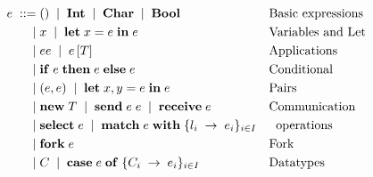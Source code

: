 \begin{figure}
  \begin{align*}
    e \; ::= \; & () \;\mid\; \mathbf{Int} \;\mid\; \mathbf{Char} \;\mid\; \mathbf{Bool} && \text{Basic expressions}\\
    \;\mid\; & x \;\mid\; \mathbf{let} \; x = e \; \mathbf{in} \; e && \text{Variables and Let}\\
    \;\mid\; & ee \;\mid\; e\,[T] && \text{Applications}\\
    \;\mid\; & \mathbf{if}\;e\;\mathbf{then}\;e\;\mathbf{else} \; e && \text{Conditional}\\
    \;\mid\; & (e,e) \;\mid\; \mathbf{let}\;x, y = e\;\mathbf{in}\;e && \text{Pairs}\\
    \;\mid\; & \mathbf{new}\;T \;\mid\; \mathbf{send}\;e\; e \;\mid\; \mathbf{receive}\;e && \text{Communication}\\
    \;\mid\; & \mathbf{select}\;e \;\mid\; \mathbf{match}\;e\;\mathbf{with}\;\{l_i\;\to\;e_i\}_{i\in I} && \text{\;\;operations} \\
    \;\mid\; & \mathbf{fork}\;e  && \text{Fork}\\
    \;\mid\; & C \;\mid\; \mathbf{case}\;e\;\mathbf{of}\;\{C_i\;\to\;e_i\}_{i\in I} && \text{Datatypes}
  \end{align*}
\end{figure}


